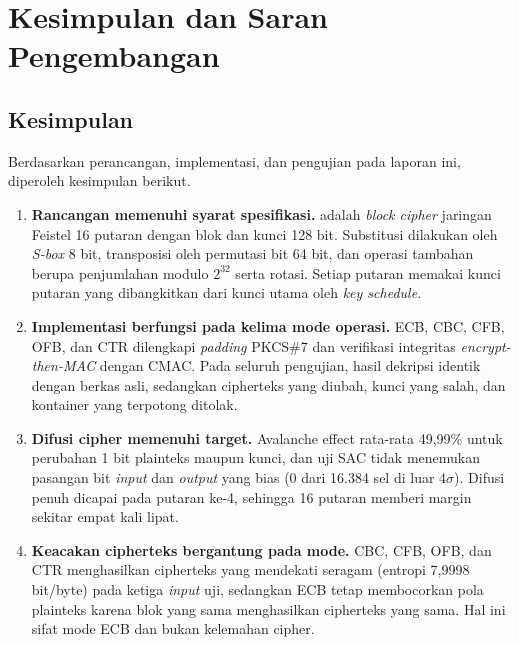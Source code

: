 \section{Kesimpulan dan Saran Pengembangan}

\subsection{Kesimpulan}
Berdasarkan perancangan, implementasi, dan pengujian pada laporan ini, diperoleh kesimpulan berikut.

\begin{enumerate}
  \item \textbf{Rancangan memenuhi syarat spesifikasi.} \algname{} adalah \textit{block cipher}
    jaringan Feistel 16 putaran dengan blok dan kunci 128 bit. Substitusi dilakukan oleh \textit{S-box}
    8 bit, transposisi oleh permutasi bit 64 bit, dan operasi tambahan berupa penjumlahan modulo
    $2^{32}$ serta rotasi. Setiap putaran memakai kunci putaran yang dibangkitkan dari kunci utama oleh
    \textit{key schedule}.

  \item \textbf{Implementasi berfungsi pada kelima mode operasi.} ECB, CBC, CFB, OFB, dan CTR
    dilengkapi \textit{padding} PKCS\#7 dan verifikasi integritas \textit{encrypt-then-MAC}
    dengan CMAC. Pada seluruh pengujian, hasil dekripsi identik dengan berkas asli, sedangkan
    cipherteks yang diubah, kunci yang salah, dan kontainer yang terpotong ditolak.

  \item \textbf{Difusi cipher memenuhi target.} Avalanche effect rata-rata 49,99\% untuk perubahan
    1 bit plainteks maupun kunci, dan uji SAC tidak menemukan pasangan bit \textit{input} dan
    \textit{output} yang bias (0 dari 16.384 sel di luar $4\sigma$). Difusi penuh dicapai pada putaran
    ke-4, sehingga 16 putaran memberi margin sekitar empat kali lipat.

  \item \textbf{Keacakan cipherteks bergantung pada mode.} CBC, CFB, OFB, dan CTR menghasilkan
    cipherteks yang mendekati seragam (entropi 7,9998 bit/byte) pada ketiga \textit{input} uji,
    sedangkan ECB tetap membocorkan pola plainteks karena blok yang sama menghasilkan cipherteks
    yang sama. Hal ini sifat mode ECB dan bukan kelemahan cipher.


\end{enumerate}
